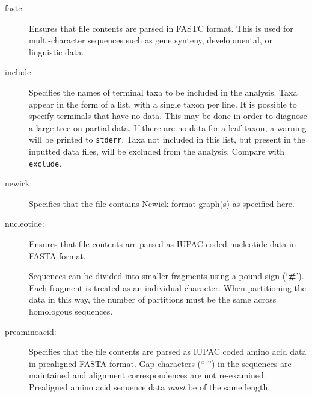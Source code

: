 \begin{description}
		\item [fastc:] Ensures that file contents are parsed in FASTC \citep{WheelerandWashburn2019}
		format. This is used for multi-character sequences such as gene synteny, developmental, 
		or linguistic data.
			
			
		\item [include:] Specifies the names of terminal taxa to be included in the analysis. 
		Taxa appear in the form of a list, with a single taxon per line. It is possible to specify 
		terminals that have no data. This may be done in order to diagnose a large tree on 
		partial data. If there are no data for a leaf taxon, a warning will be printed to \texttt{stderr}. 
		Taxa not included in this list, but present in the inputted data files, will be excluded from 
		the analysis. Compare with \texttt{exclude}.
			
		\item [newick:] Specifies that the file contains Newick format graph(s) as specified 
		\href{https://evolution.genetics.washington.edu/phylip/newick_doc.html}{here}.
			
		\item [nucleotide:] Ensures that file contents are parsed as IUPAC coded nucleotide data 
		in FASTA \citep{PearsonandLipman1988} format.
		
		\begin{tcolorbox}[enhanced,fit to height=2.5cm,
  		colback=yellow!10!black!2!white,colframe=yellow!90!black,title=Note,
  		drop fuzzy shadow]
  		Sequences can be divided into smaller fragments using a pound sign (`\textbf{\#}').
		Each fragment is treated as an individual character. When partitioning the data in this way,
		the number of partitions must be the same across homologous sequences. 
		\end{tcolorbox}
			
		\item [preaminoacid:] Specifies that the file contents are parsed as IUPAC coded amino 
		acid data in prealigned FASTA \citep{PearsonandLipman1988} format. Gap characters (``-'') 
		in the sequences are maintained and alignment correspondences are not re-examined.
		Prealigned amino acid sequence data \textit{must} be of the same length.
	

\end{description}
